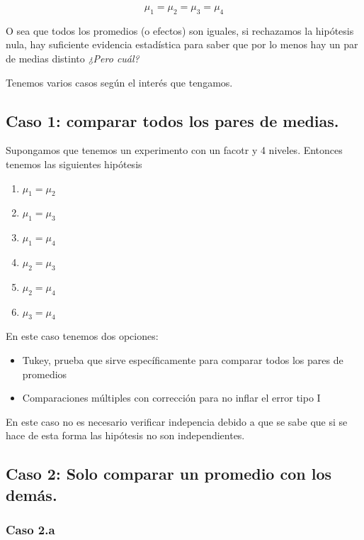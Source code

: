 \documentclass[
]{article}
\providecommand{\tightlist}{%
  \setlength{\itemsep}{0pt}\setlength{\parskip}{0pt}}
\begin{document}
\[\mu_1=\mu_2=\mu_3=\mu_4\]

O sea que todos los promedios (o efectos) son iguales, si rechazamos la
hipótesis nula, hay suficiente evidencia estadística para saber que por
lo menos hay un par de medias distinto \emph{¿Pero cuál?}

Tenemos varios casos según el interés que tengamos.

\subsection{Caso 1: comparar todos los pares de
medias.}\label{caso-1-comparar-todos-los-pares-de-medias.}

Supongamos que tenemos un experimento con un facotr y 4 niveles.
Entonces tenemos las siguientes hipótesis

\begin{enumerate}
\def\labelenumi{\arabic{enumi}.}
\tightlist
\item
  \(\mu_1=\mu_2\)
\item
  \(\mu_1=\mu_3\)
\item
  \(\mu_1=\mu_4\)
\item
  \(\mu_2=\mu_3\)
\item
  \(\mu_2=\mu_4\)
\item
  \(\mu_3=\mu_4\)
\end{enumerate}

En este caso tenemos dos opciones:

\begin{itemize}
\tightlist
\item
  Tukey, prueba que sirve específicamente para comparar todos los pares
  de promedios
\item
  Comparaciones múltiples con corrección para no inflar el error tipo I
\end{itemize}

En este caso no es necesario verificar indepencia debido a que se sabe
que si se hace de esta forma las hipótesis no son independientes.

\subsection{Caso 2: Solo comparar un promedio con los
demás.}\label{caso-2-solo-comparar-un-promedio-con-los-demuxe1s.}

\subsubsection{Caso 2.a}\label{caso-2.a}
\end{document}
